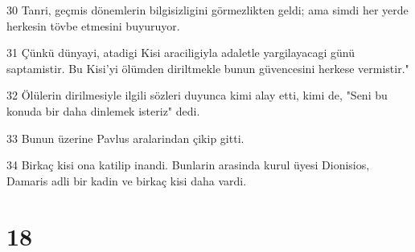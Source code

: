 \par 30 Tanri, geçmis dönemlerin bilgisizligini görmezlikten geldi; ama simdi her yerde herkesin tövbe etmesini buyuruyor.
\par 31 Çünkü dünyayi, atadigi Kisi araciligiyla adaletle yargilayacagi günü saptamistir. Bu Kisi'yi ölümden diriltmekle bunun güvencesini herkese vermistir."
\par 32 Ölülerin dirilmesiyle ilgili sözleri duyunca kimi alay etti, kimi de, "Seni bu konuda bir daha dinlemek isteriz" dedi.
\par 33 Bunun üzerine Pavlus aralarindan çikip gitti.
\par 34 Birkaç kisi ona katilip inandi. Bunlarin arasinda kurul üyesi Dionisios, Damaris adli bir kadin ve birkaç kisi daha vardi.

\chapter{18}

